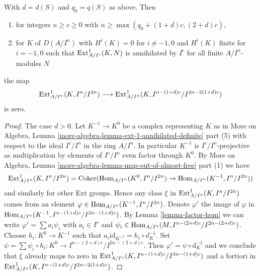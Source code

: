 \begin{lemma}
\label{lemma-bound-two-term-complex}
With $d = d(S)$ and $q_0 = q(S)$ as above. Then
\begin{enumerate}
\item for integers $n \geq c \geq 0$ with
$n \geq \max(q_0 + (1 + d)c, (2 + d)c)$,
\item for $K$ of $D(A/I^n)$ with $H^i(K) = 0$ for $i \not = -1, 0$
and $H^i(K)$ finite for $i = -1, 0$ such that $\mathop{\mathrm{Ext}}\nolimits^1_{A/I^c}(K, N)$
is annihilated by $I^c$ for all finite $A/I^n$-modules $N$
\end{enumerate}
the map
$$
\mathop{\mathrm{Ext}}\nolimits^1_{A/I^n}(K, I^n/I^{2n})
\longrightarrow
\mathop{\mathrm{Ext}}\nolimits^1_{A/I^n}(K, I^{n - (1 + d)c}/I^{2n - 2(1 + d)c})
$$
is zero.
\end{lemma}

\begin{proof}
The case $d > 0$. Let $K^{-1} \to K^0$ be a complex representing $K$ as in
More on Algebra, Lemma \ref{more-algebra-lemma-ext-1-annihilated-definite}
part (5) with respect to the ideal $I^c/I^n$ in the ring $A/I^n$.
In particular $K^{-1}$ is $I^c/I^n$-projective as multiplication
by elements of $I^c/I^n$ even factor through $K^0$. By
More on Algebra, Lemma \ref{more-algebra-lemma-map-out-of-almost-free} part (1)
we have
$$
\mathop{\mathrm{Ext}}\nolimits^1_{A/I^n}(K, I^n/I^{2n}) =
\mathop{\mathrm{Coker}}(\mathop{\mathrm{Hom}}\nolimits_{A/I^n}(K^0, I^n/I^{2n}) \to \mathop{\mathrm{Hom}}\nolimits_{A/I^n}(K^{-1}, I^n/I^{2n}))
$$
and similarly for other Ext groups. Hence any class $\xi$ in
$\mathop{\mathrm{Ext}}\nolimits^1_{A/I^n}(K, I^n/I^{2n})$
comes from an element $\varphi \in \mathop{\mathrm{Hom}}\nolimits_{A/I^n}(K^{-1}, I^n/I^{2n})$.
Denote $\varphi'$ the image of $\varphi$ in
$\mathop{\mathrm{Hom}}\nolimits_{A/I^n}(K^{-1}, I^{n - (1 + d)c}/I^{2n - (1 + d)c})$.
By Lemma \ref{lemma-factor-hom}
we can write $\varphi' = \sum a_i \psi_i$ with $a_i \in I^c$ and
$\psi_i \in \mathop{\mathrm{Hom}}\nolimits_{A/I^n}(M, I^{n - (2 + d)c}/I^{2n - (2 + d)c})$.
Choose $h_i : K^0 \to K^{-1}$ such that
$a_i \text{id}_{K^{-1}} = h_i \circ d_K^{-1}$. Set
$\psi = \sum \psi_i \circ h_i : K^0 \to I^{n - (2 + d)c}/I^{2n - (2 + d)c}$.
Then $\varphi' = \psi \circ \text{d}_K^{-1}$ and we conclude that
$\xi$ already maps to zero in
$\mathop{\mathrm{Ext}}\nolimits^1_{A/I^n}(K, I^{n - (1 + d)c}/I^{2n - (1 + d)c})$
and a fortiori in
$\mathop{\mathrm{Ext}}\nolimits^1_{A/I^n}(K, I^{n - (1 + d)c}/I^{2n - 2(1 + d)c})$.


\end{proof}

